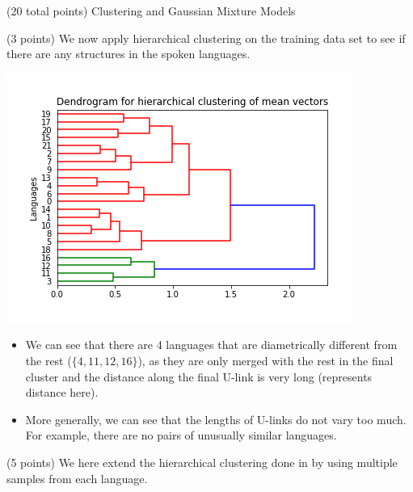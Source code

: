 \documentclass[12pt]{article}
\begin{document}
\begin{question}{(20 total points) Clustering and Gaussian Mixture Models}
\begin{subquestion}
   \end{subquestion}
   \begin{subquestion}{(3 points)
       We now apply hierarchical clustering on the training data set
       to see if there are any structures in the spoken languages.
     } \label{Q3.3}


     

      \begin{answerbox}{35em}
           \begin{center}
	\includegraphics[width=\textwidth]{imgs/3_3.png}
	\end{center}
	\begin{itemize}
	\itemsep -3pt {}
	\item We can see that there are 4 languages that are diametrically different from the rest ($\{4,11,12,16\}$), as they are only merged with the rest in the final cluster and the distance along the final U-link is very long (represents distance here).
	\item More generally, we can see that the lengths of U-links do not vary too much. For example, there are no pairs of unusually similar languages. 
	\end{itemize}
      \end{answerbox}
  


   \end{subquestion}
   \begin{subquestion}{(5 points)
       We here extend the hierarchical clustering done in  by
       using multiple samples from each language.
     } \label{Q3.4}



\end{subquestion}
\end{question}
\end{document}

